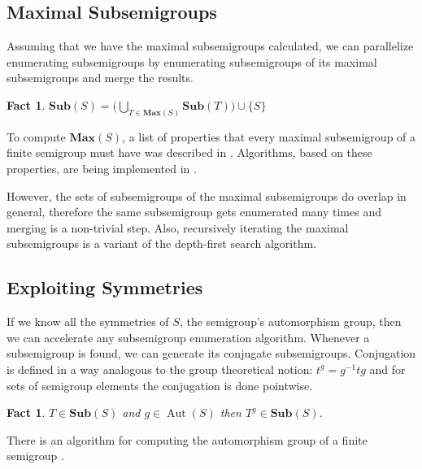 \documentclass{amsart}
\newcommand{\Sub}{\mathbf{Sub}}
\newcommand{\Max}{\mathbf{Max}}
\DeclareMathOperator{\Aut}{Aut}
\theoremstyle{plain}
\newtheorem{fact}[theorem]{Fact}
\theoremstyle{definition}
\begin{document}
\subsection{Maximal Subsemigroups}
Assuming that we have the maximal subsemigroups calculated, we can parallelize enumerating subsemigroups by enumerating subsemigroups of its maximal subsemigroups and merge the results.
\begin{fact}
$\Sub(S)=\big( \bigcup_{T\in \Max(S)}\Sub(T)\big)\cup \{S\}$
\end{fact}
\noindent To compute $\Max(S)$, a list of properties that every maximal subsemigroup of a finite semigroup must have was described in \cite{MaxSubSemi}.
Algorithms, based on these properties, are being implemented in \cite{Semigroups}.  


However, the sets of subsemigroups of the maximal subsemigroups do overlap in general, therefore the same subsemigroup gets enumerated many times and merging is a non-trivial step.
Also, recursively iterating the maximal subsemigroups is a variant of the depth-first search algorithm.  

\subsection{Exploiting Symmetries}
If we know all the symmetries of $S$, the semigroup's automorphism group, then we can accelerate any subsemigroup enumeration algorithm.
Whenever a subsemigroup is found, we can generate its conjugate subsemigroups.
Conjugation is defined in a way analogous to the group theoretical notion: $t^g=g^{-1}tg$ and for sets of semigroup elements the conjugation is done pointwise.
 
\begin{fact}
$T\in\Sub(S)$ and $g\in \Aut(S)$ then $T^g\in\Sub(S)$.%
\end{fact}
There is an algorithm for computing the automorphism group of a finite semigroup \cite{computingautomorphisms2010}.
\end{document}
